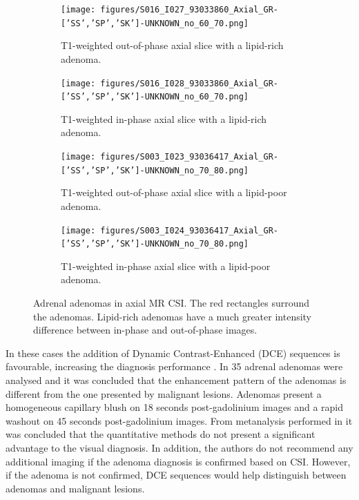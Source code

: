 \documentclass{article}
\begin{document}
\begin{figure}
    \centering
    \begin{subfigure}[b]{0.45\textwidth}
        \centering
        \texttt{[image: figures/S016\_I027\_93033860\_Axial\_GR-['SS','SP','SK']-UNKNOWN\_no\_60\_70.png]}
        \caption{T1-weighted out-of-phase axial slice with a lipid-rich adenoma.}
        \label{fig:adenoma_lr_OP}
    \end{subfigure}
    \hfill
    \begin{subfigure}[b]{0.45\textwidth}
        \centering
        \texttt{[image: figures/S016\_I028\_93033860\_Axial\_GR-['SS','SP','SK']-UNKNOWN\_no\_60\_70.png]}
        \caption{T1-weighted in-phase axial slice with a lipid-rich adenoma.}
        \label{fig:adenoma_lr_IP}
    \end{subfigure}
    \vfill
    \begin{subfigure}[b]{0.45\textwidth}
        \centering
        \texttt{[image: figures/S003\_I023\_93036417\_Axial\_GR-['SS','SP','SK']-UNKNOWN\_no\_70\_80.png]}
        \caption{T1-weighted out-of-phase axial slice with a lipid-poor adenoma.}
        \label{fig:adenoma_lp_OP}
    \end{subfigure}
    \hfill
    \begin{subfigure}[b]{0.45\textwidth}
        \centering
        \texttt{[image: figures/S003\_I024\_93036417\_Axial\_GR-['SS','SP','SK']-UNKNOWN\_no\_70\_80.png]}
        \caption{T1-weighted in-phase axial slice with a lipid-poor adenoma.}
        \label{fig:adenoma_lp_IP}
    \end{subfigure}
    \caption{Adrenal adenomas in axial MR CSI. The red rectangles surround the adenomas. Lipid-rich adenomas have a much greater intensity difference between in-phase and out-of-phase images.   }
    \label{fig:adenomas}
\end{figure}

In these cases the addition of Dynamic Contrast-Enhanced (DCE) sequences is
favourable, increasing the diagnosis performance \cite{Barat2022}. In
\cite{Chung2001} 35 adrenal adenomas were analysed and it was concluded that the
enhancement pattern of the adenomas is different from the one presented by
malignant lesions. Adenomas present a homogeneous capillary blush on 18 seconds
post-gadolinium images and a rapid washout on 45 seconds post-gadolinium images.
From metanalysis performed in \cite{Platzek2019} it was concluded that the
quantitative methods do not present a significant advantage to the visual
diagnosis. In addition, the authors do not recommend any additional imaging if
the adenoma diagnosis is confirmed based on CSI. However, if the adenoma is not
confirmed, DCE sequences would help distinguish between adenomas and
malignant lesions.
\end{document}
